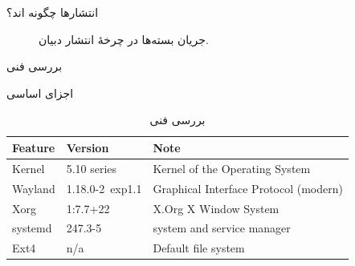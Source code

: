 \documentclass[hyperref={colorlinks}]{beamer}
\begin{document}
\begin{persian}
\begin{frame}{انتشارها چگونه اند؟}
\begin{figure}[ht]
\begin{adjustbox}{scale=0.7}
	\end{adjustbox}
	\caption{جریان بسته‌ها در چرخهٔ انتشار دبیان.}
	\label{fig:pkgflow}
\end{figure}
\end{frame}
\end{persian}

\begin{persian}
\begin{frame}{بررسی فنی}
\begin{block}{اجزای اساسی}
\begin{table}
	\begin{latin}
	\begin{tabular}{l l l}
		\toprule
		\textbf{Feature} & \textbf{Version} & \textbf{Note}\\
		\midrule
		Kernel & 5.10 series & Kernel of the Operating System \\
		Wayland & 1.18.0-2~exp1.1   & Graphical Interface Protocol (modern) \\ 
		Xorg & 1:7.7+22 & X.Org X Window System \\
		systemd & 247.3-5 & system and service manager\\
		Ext4 & n/a & Default file system
	\end{tabular}
	\end{latin}
	\caption{بررسی فنی}
\end{table}
\end{block}
\end{frame}
\end{persian}

\end{document}

